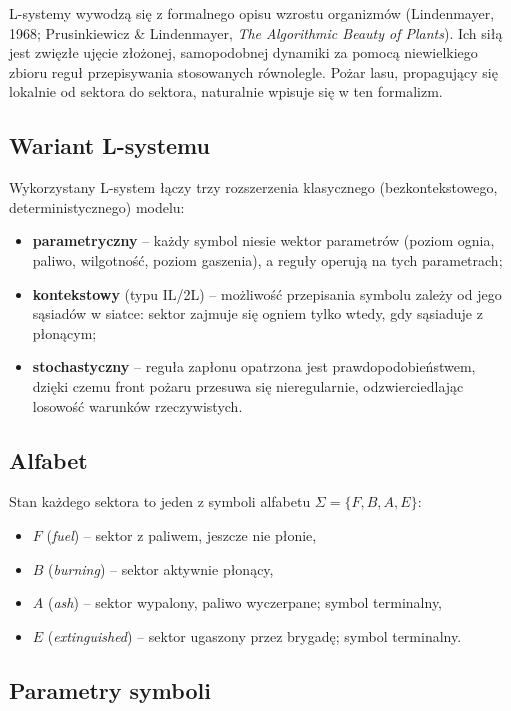L-systemy wywodzą się z formalnego opisu wzrostu organizmów (Lindenmayer, 1968; Prusinkiewicz \& Lindenmayer, \textit{The Algorithmic Beauty of Plants}). Ich siłą jest zwięzłe ujęcie złożonej, samopodobnej dynamiki za pomocą niewielkiego zbioru reguł przepisywania stosowanych równolegle. Pożar lasu, propagujący się lokalnie od sektora do sektora, naturalnie wpisuje się w ten formalizm.

\subsection{Wariant L-systemu}

Wykorzystany L-system łączy trzy rozszerzenia klasycznego (bezkontekstowego, deterministycznego) modelu:
\begin{itemize}
  \item \textbf{parametryczny} -- każdy symbol niesie wektor parametrów (poziom ognia, paliwo, wilgotność, poziom gaszenia), a reguły operują na tych parametrach;
  \item \textbf{kontekstowy} (typu IL/2L) -- możliwość przepisania symbolu zależy od jego sąsiadów w siatce: sektor zajmuje się ogniem tylko wtedy, gdy sąsiaduje z płonącym;
  \item \textbf{stochastyczny} -- reguła zapłonu opatrzona jest prawdopodobieństwem, dzięki czemu front pożaru przesuwa się nieregularnie, odzwierciedlając losowość warunków rzeczywistych.
\end{itemize}

\subsection{Alfabet}

Stan każdego sektora to jeden z symboli alfabetu $\Sigma = \{F, B, A, E\}$:
\begin{itemize}
  \item $F$ (\textit{fuel}) -- sektor z paliwem, jeszcze nie płonie,
  \item $B$ (\textit{burning}) -- sektor aktywnie płonący,
  \item $A$ (\textit{ash}) -- sektor wypalony, paliwo wyczerpane; symbol terminalny,
  \item $E$ (\textit{extinguished}) -- sektor ugaszony przez brygadę; symbol terminalny.
\end{itemize}

\subsection{Parametry symboli}

